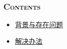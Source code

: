 \documentclass[aspectratio=169, 10pt, utf8, mathserif]{beamer}
\numberwithin{equation}{section} %
\numberwithin{figure}{section} %
\begin{document}

\begin{frame}%
    \frametitle{\textsc{Contents}} \vspace{-1.05cm}
    \begin{multicols}{2}
    \begin{minipage}[t]{0.55\textwidth}
    \end{minipage}

    \begin{minipage}[t]{0.55\textwidth}
    \vspace{0.44cm}
    \begin{spacing}{1.2} %
    \begin{itemize}
    \item\hyperlink{subsec:1-1}{背景与存在问题}
    \item\hyperlink{subsec:1-2}{解决办法}
    \end{itemize}
    \end{spacing}
    \end{minipage}
    \end{multicols}

\end{frame}

\end{document}

